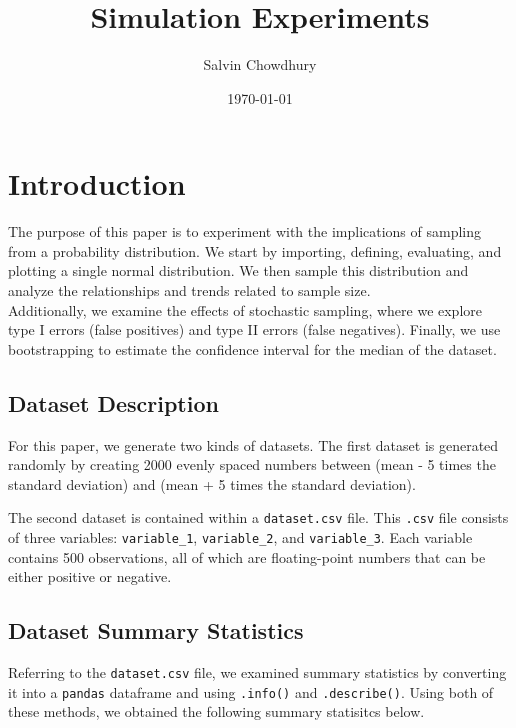 \documentclass[a4paper,twocolumn]{article}
\title{Simulation Experiments}
\author{Salvin Chowdhury}
\date{\today}
\begin{document}
\setlength{\intextsep}{0pt} 
\setlength{\textfloatsep}{5pt} 

\maketitle
\onecolumn
\tableofcontents
\newpage
\twocolumn


\section{Introduction}
The purpose of this paper is to experiment with the implications of sampling from a probability distribution. 
We start by importing, defining, evaluating, and plotting a single normal distribution. We then sample this 
distribution and analyze the relationships and trends related to sample size. \\

Additionally, we examine the effects of stochastic sampling, where we explore type I errors (false positives) and
 type II errors (false negatives). Finally, we use bootstrapping to estimate the confidence interval for the median 
 of the dataset. \\


\subsection{Dataset Description}
For this paper, we generate two kinds of datasets. The first dataset is generated randomly by creating 2000 evenly 
spaced numbers between (mean - 5 times the standard deviation) and (mean + 5 times the standard deviation). 

The second dataset is contained within a \texttt{dataset.csv} file. This \texttt{.csv} file consists of three 
variables: \texttt{variable\_1}, \texttt{variable\_2}, and \texttt{variable\_3}. Each variable contains 500 
observations, all of which are floating-point numbers that can be either positive or negative.

\subsection{Dataset Summary Statistics}
Referring to the \texttt{dataset.csv} file, we examined summary statistics by converting it into a \texttt{pandas}
dataframe and using \texttt{.info()} and \texttt{.describe()}. Using both of these methods, we obtained the 
following summary statisitcs below. \\
\end{document}
